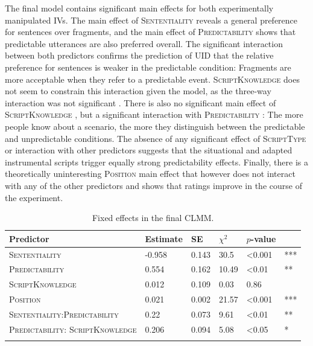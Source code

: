 The final model contains significant main effects for both experimentally manipulated IVs. The main effect of \textsc{Sententiality}  reveals a general preference for sentences over fragments, and the main effect of \textsc{Predictability}  shows that predictable utterances are also preferred overall. The significant interaction  between both predictors confirms the prediction of UID that the relative preference for sentences is weaker in the predictable condition: Fragments are more acceptable when they refer to a predictable event. \textsc{ScriptKnowledge} does not seem to constrain this interaction given the model, as the three-way interaction was not significant . There is also no significant main effect of \textsc{ScriptKnowledge} , but a significant interaction with \textsc{Predictability} : The more people know about a scenario, the more they distinguish between the predictable and unpredictable conditions. The absence of any significant effect of \textsc{ScriptType} or interaction with other predictors suggests that the situational and adapted instrumental scripts trigger equally strong predictability effects. Finally, there is a theoretically uninteresting \textsc{Position} main effect that however does not interact with any of the other predictors and shows that ratings improve in the course of the experiment.

\begin{table}[!ht]
\centering
\caption{Fixed effects in the final CLMM. \label{tab:scripts-rating-estimates}}
\begin{tabular}{p{3.4cm}lllll}
\lsptoprule
Predictor & Estimate & SE & $\chi^2$ &  $p$-value &  \\   
\midrule
\textsc{Sententiality}      &  -0.958 & 0.143 & 30.5 & \textless 0.001 & ***\\
\textsc{Predictability}    &   \phantom{-}0.554 &  0.162 & 10.49 & \textless 0.01 & ** \\
\textsc{ScriptKnowledge}    &  \phantom{-}0.012 &  0.109 & \phantom{1}0.03 & \phantom{\textless }0.86  &  \\
\textsc{Position}   & \phantom{-}0.021 & 0.002 & 21.57 & \textless 0.001 & *** \\
\textsc{Sententiality:}\linebreak \textsc{Predictability} &   \phantom{-}0.22 &  0.073  & \phantom{-}9.61 & \textless 0.01 & **\\
\textsc{Predictability:} \textsc{ScriptKnowledge}   &  \phantom{-}0.206 & 0.094 & \phantom{1}5.08  & \textless 0.05 & *\\
\lspbottomrule
\end{tabular}
\end{table}

